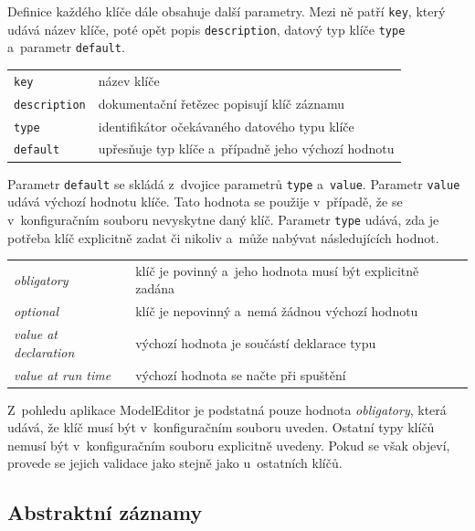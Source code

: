 \documentclass[FM,bw,DP]{tulthesis}
\begin{document}
Definice každého klíče dále obsahuje další parametry. Mezi ně patří \texttt{key}, který udává název klíče, poté opět popis \texttt{description}, datový typ klíče \texttt{type} a~parametr \texttt{default}.

\vspace{0.5cm}
\begin{tabular}{m{4cm}@{}l}
\texttt{key}\dotfill & název klíče \\
\texttt{description}\dotfill & dokumentační řetězec popisují klíč záznamu \\
\texttt{type}\dotfill & identifikátor očekávaného datového typu klíče \\
\texttt{default}\dotfill & upřesňuje typ klíče a~případně jeho výchozí hodnotu \\
\end{tabular}
\vspace{0.5cm}

Parametr \texttt{default} se skládá z~dvojice parametrů \texttt{type} a~\texttt{value}. Parametr \texttt{value} udává výchozí hodnotu klíče. Tato hodnota se použije v~případě, že se v~konfiguračním souboru nevyskytne daný klíč. Parametr \texttt{type} udává, zda je potřeba klíč explicitně zadat či nikoliv a~může nabývat následujících hodnot.

\begin{longtable}{m{4cm}@{}l}
\textit{obligatory}\dotfill & klíč je povinný a~jeho hodnota musí být explicitně zadána \\
\textit{optional}\dotfill & klíč je nepovinný a~nemá žádnou výchozí hodnotu \\
\textit{value at declaration}\dotfill & výchozí hodnota je součástí deklarace typu \\
\textit{value at run time}\dotfill & výchozí hodnota se načte při spuštění \\
\end{longtable}

Z~pohledu aplikace ModelEditor je podstatná pouze hodnota \textit{obligatory}, která udává, že klíč musí být v~konfiguračním souboru uveden. Ostatní typy klíčů nemusí být v~konfiguračním souboru explicitně uvedeny. Pokud se však objeví, provede se jejich validace jako stejně jako u~ostatních klíčů.

\subsection{Abstraktní záznamy}
\label{sec:analyza-specifikace-formatu-abstraktni-zaznamy}
\end{document}
